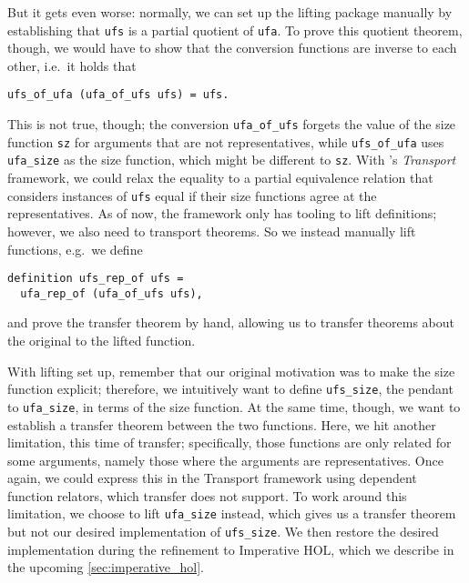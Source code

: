 \documentclass[
  sigplan,
  10pt,
  anonymous,
  review,
  ]{acmart}
\begin{document}
But it gets even worse:
normally, we can set up the lifting package manually by establishing that \lstinline|ufs| is a partial quotient of \lstinline|ufa|.
To prove this quotient theorem, though, we would have to show that the conversion functions are inverse to each other, i.e.\ it holds that
\begin{lstlisting}
ufs_of_ufa (ufa_of_ufs ufs) = ufs.
\end{lstlisting}
This is not true, though;
the conversion \lstinline|ufa_of_ufs| forgets the value of the size function \lstinline|sz| for arguments that are not representatives, while \lstinline|ufs_of_ufa| uses \lstinline|ufa_size| as the size function, which might be different to \lstinline|sz|.
With \citeauthor{transport}'s \emph{Transport} framework, we could relax the equality to a partial equivalence relation that considers instances of \lstinline|ufs| equal if their size functions agree at the representatives. 
As of now, the framework only has tooling to lift definitions; however, we also need to transport theorems.
So we instead manually lift functions, e.g.\ we define
\begin{lstlisting}
definition ufs_rep_of ufs =
  ufa_rep_of (ufa_of_ufs ufs),
\end{lstlisting}
and prove the transfer theorem by hand, allowing us to transfer theorems about the original to the lifted function.

With lifting set up, remember that our original motivation was to make the size function explicit;
therefore, we intuitively want to define \lstinline|ufs_size|, the pendant to \lstinline|ufa_size|, in terms of the size function.
At the same time, though, we want to establish a transfer theorem between the two functions.
Here, we hit another limitation, this time of transfer;
specifically, those functions are only related for some arguments, namely those where the arguments are representatives.
Once again, we could express this in the Transport framework using dependent function relators, which transfer does not support.
To work around this limitation, we choose to lift \lstinline|ufa_size| instead, which gives us a transfer theorem but not our desired implementation of \lstinline|ufs_size|.
We then restore the desired implementation during the refinement to Imperative HOL, which we describe in the upcoming \autoref{sec:imperative_hol}.
\end{document}

